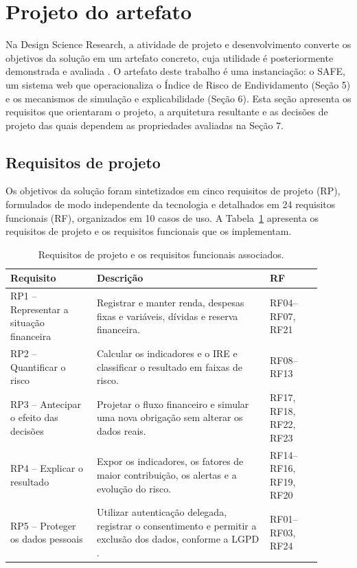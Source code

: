\documentclass[portuguese]{sbc2025}%
\begin{document}
\section{Projeto do artefato}

Na Design Science Research, a atividade de projeto e desenvolvimento converte os objetivos da solução em um artefato concreto, cuja utilidade é posteriormente demonstrada e avaliada \citep{hevner2004, peffers2007}. O artefato deste trabalho é uma instanciação: o SAFE, um sistema web que operacionaliza o Índice de Risco de Endividamento (Seção 5) e os mecanismos de simulação e explicabilidade (Seção 6). Esta seção apresenta os requisitos que orientaram o projeto, a arquitetura resultante e as decisões de projeto das quais dependem as propriedades avaliadas na Seção 7.

\subsection{Requisitos de projeto}

Os objetivos da solução foram sintetizados em cinco requisitos de projeto (RP), formulados de modo independente da tecnologia e detalhados em 24 requisitos funcionais (RF), organizados em 10 casos de uso. A Tabela~\ref{tab:requisitos_projeto} apresenta os requisitos de projeto e os requisitos funcionais que os implementam.

\begin{table}[!ht]
\caption{Requisitos de projeto e os requisitos funcionais associados.}
\centering
\begin{tabular}{@{}p{0.25\linewidth} p{0.50\linewidth} p{0.15\linewidth}@{}}
\hline\hline
\textbf{Requisito} & \textbf{Descrição} & \textbf{RF} \\
\hline
RP1 -- Representar a situação financeira & Registrar e manter renda, despesas fixas e variáveis, dívidas e reserva financeira. & RF04--RF07, RF21 \\
RP2 -- Quantificar o risco & Calcular os indicadores e o IRE e classificar o resultado em faixas de risco. & RF08--RF13 \\
RP3 -- Antecipar o efeito das decisões & Projetar o fluxo financeiro e simular uma nova obrigação sem alterar os dados reais. & RF17, RF18, RF22, RF23 \\
RP4 -- Explicar o resultado & Expor os indicadores, os fatores de maior contribuição, os alertas e a evolução do risco. & RF14--RF16, RF19, RF20 \\
RP5 -- Proteger os dados pessoais & Utilizar autenticação delegada, registrar o consentimento e permitir a exclusão dos dados, conforme a LGPD \citep{lgpd}. & RF01--RF03, RF24 \\
\hline\hline
\end{tabular}
\label{tab:requisitos_projeto}
\end{table}
\end{document}
